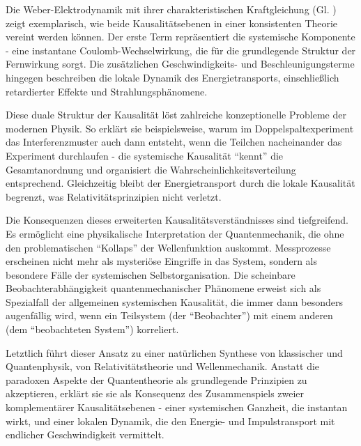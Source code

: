 Die Weber-Elektrodynamik mit ihrer charakteristischen Kraftgleichung (Gl. ) zeigt exemplarisch, wie beide Kausalitätsebenen in einer konsistenten Theorie vereint werden können.
Der erste Term repräsentiert die systemische Komponente - eine instantane Coulomb-Wechselwirkung, die für die grundlegende Struktur der Fernwirkung sorgt. Die zusätzlichen Geschwindigkeits- und
Beschleunigungsterme hingegen beschreiben die lokale Dynamik des Energietransports, einschließlich retardierter Effekte und Strahlungsphänomene.

Diese duale Struktur der Kausalität löst zahlreiche konzeptionelle Probleme der modernen Physik. So erklärt sie beispielsweise, warum im Doppelspaltexperiment das Interferenzmuster
auch dann entsteht, wenn die Teilchen nacheinander das Experiment durchlaufen - die systemische Kausalität \enquote{kennt} die Gesamtanordnung und organisiert die Wahrscheinlichkeitsverteilung
entsprechend. Gleichzeitig bleibt der Energietransport durch die lokale Kausalität begrenzt, was Relativitätsprinzipien nicht verletzt.

Die Konsequenzen dieses erweiterten Kausalitätsverständnisses sind tiefgreifend. Es ermöglicht eine physikalische Interpretation der Quantenmechanik, die ohne den problematischen
\enquote{Kollaps} der Wellenfunktion auskommt. Messprozesse erscheinen nicht mehr als mysteriöse Eingriffe in das System, sondern als besondere Fälle der systemischen Selbstorganisation.
Die scheinbare Beobachterabhängigkeit quantenmechanischer Phänomene erweist sich als Spezialfall der allgemeinen systemischen Kausalität, die immer dann besonders augenfällig wird, wenn
ein Teilsystem (der \enquote{Beobachter}) mit einem anderen (dem \enquote{beobachteten System}) korreliert.

Letztlich führt dieser Ansatz zu einer natürlichen Synthese von klassischer und Quantenphysik, von Relativitätstheorie und Wellenmechanik. Anstatt die paradoxen Aspekte der Quantentheorie
als grundlegende Prinzipien zu akzeptieren, erklärt sie sie als Konsequenz des Zusammenspiels zweier komplementärer Kausalitätsebenen - einer systemischen Ganzheit, die instantan wirkt,
und einer lokalen Dynamik, die den Energie- und Impulstransport mit endlicher Geschwindigkeit vermittelt.

